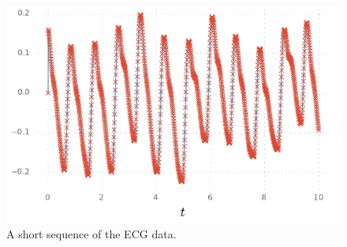 
 \begin{figure}[htb]%
    \centering%
    \includegraphics{img/harmonic_trajectory}%
	\caption{%
	A short sequence of the ECG data. %
   	}
	\label{fig:ecg_data}
 \end{figure}
